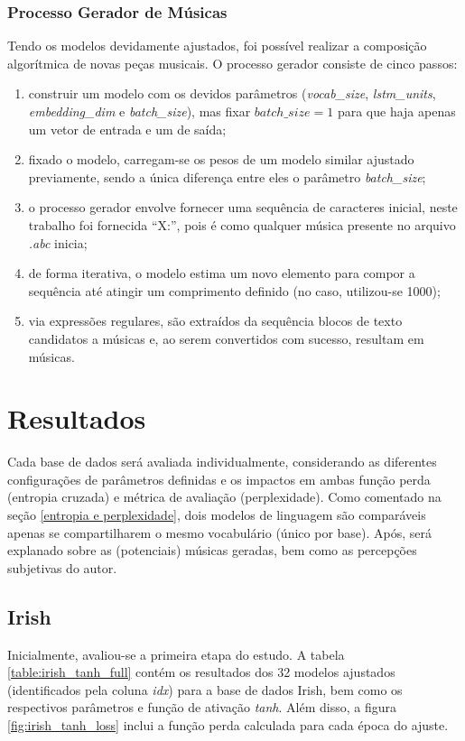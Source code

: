 \documentclass{automatextcc}
\begin{document}
\subsection{Processo Gerador de Músicas}
Tendo os modelos devidamente ajustados, foi possível realizar a composição algorítmica de novas peças musicais. O processo gerador consiste de cinco passos:
\begin{enumerate}
    \item construir um modelo com os devidos parâmetros (\textit{vocab\_size}, \textit{lstm\_units}, \textit{embedding\_dim} e \textit{batch\_size}), mas fixar $batch\_size=1$ para que haja apenas um vetor de entrada e um de saída; 
    \item fixado o modelo, carregam-se os pesos de um modelo similar ajustado previamente, sendo a única diferença entre eles o parâmetro \textit{batch\_size};
    \item o processo gerador envolve fornecer uma sequência de caracteres inicial, neste trabalho foi fornecida ``X:'', pois é como qualquer música presente no arquivo \textit{.abc} inicia;
    \item de forma iterativa, o modelo estima um novo elemento para compor a sequência até atingir um comprimento definido (no caso, utilizou-se 1000);
    \item via expressões regulares, são extraídos da sequência blocos de texto candidatos a músicas e, ao serem convertidos com sucesso, resultam em músicas.
\end{enumerate}




\chapter{Resultados}
Cada base de dados será avaliada individualmente, considerando as diferentes configurações de parâmetros definidas e os impactos em ambas função perda (entropia cruzada) e métrica de avaliação (perplexidade). Como comentado na seção \ref{entropia e perplexidade}, dois modelos de linguagem são comparáveis apenas se compartilharem o mesmo vocabulário (único por base). Após, será explanado sobre as (potenciais) músicas geradas, bem como as percepções subjetivas do autor. 



\section{Irish}
Inicialmente, avaliou-se a primeira etapa do estudo. A tabela \ref{table:irish_tanh_full} contém os resultados dos 32 modelos ajustados (identificados pela coluna \textit{idx}) para a base de dados Irish, bem como os respectivos parâmetros e função de ativação \textit{tanh}. Além disso, a figura \ref{fig:irish_tanh_loss} inclui a função perda calculada para cada época do ajuste. 
\end{document}
